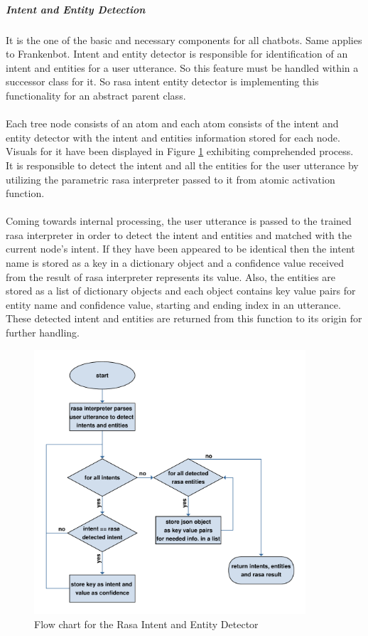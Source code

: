 \subparagraph*{Intent and Entity Detection}
It is the one of the basic and necessary components for all chatbots. Same applies to Frankenbot. Intent and entity detector is responsible for identification of an intent and entities for a user utterance. So this feature must be handled within a successor class for it. So rasa intent entity detector is implementing this functionality for an abstract parent class.
\\~\\
Each tree node consists of an atom and each atom consists of the intent and entity detector with the intent and entities information stored for each node. Visuals for it have been displayed in Figure \ref{fig:flowIntandEnt} exhibiting comprehended process. It is responsible to detect the intent and all the entities for the user utterance by utilizing the parametric rasa interpreter passed to it from atomic activation function.
\\~\\
Coming towards internal processing, the user utterance is passed to the trained rasa interpreter in order to detect the intent and entities and matched with the current node's intent. If they have been appeared to be identical then the intent name is stored as a key in a dictionary object and a confidence value received from the result of rasa interpreter represents its value. Also, the entities are stored as a list of dictionary objects and each object contains key value pairs for entity name and confidence value, starting and ending index in an utterance. These detected intent and entities are returned from this function to its origin for further handling.

\begin{figure}[!h]
    \centering
    \includegraphics[width=0.9\textwidth]{img/Intent_entity_detector.pdf}
    \caption{Flow chart for the Rasa Intent and Entity Detector}
    \label{fig:flowIntandEnt}
\end{figure}

